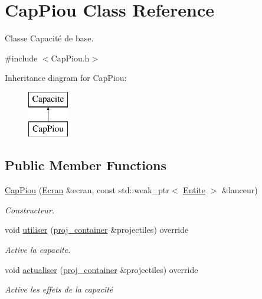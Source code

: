 \hypertarget{class_cap_piou}{}\section{Cap\+Piou Class Reference}
\label{class_cap_piou}


Classe Capacité de base.  




{\ttfamily \#include $<$Cap\+Piou.\+h$>$}

Inheritance diagram for Cap\+Piou\+:\begin{figure}[H]
\begin{center}
\leavevmode
\includegraphics[height=2.000000cm]{class_cap_piou}
\end{center}
\end{figure}
\subsection*{Public Member Functions}
\begin{DoxyCompactItemize}
\item 
\mbox{\hyperlink{class_cap_piou_aa0c57fbd8faf4c26eec74e99f00d7af3}{Cap\+Piou}} (\mbox{\hyperlink{class_ecran}{Ecran}} \&ecran, const std\+::weak\+\_\+ptr$<$ \mbox{\hyperlink{class_entite}{Entite}} $>$ \&lanceur)
\begin{DoxyCompactList}\small\item\em Constructeur. \end{DoxyCompactList}\item 
void \mbox{\hyperlink{class_cap_piou_a8833dd4c07fac882bcbad2698fdcd8c4}{utiliser}} (\mbox{\hyperlink{def__type_8h_a87980cd8ee9533e561a73e8bbc728188}{proj\+\_\+container}} \&projectiles) override
\begin{DoxyCompactList}\small\item\em Active la capacite. \end{DoxyCompactList}\item 
void \mbox{\hyperlink{class_cap_piou_ae566dc069b127f27cdd770f72dbdcbe4}{actualiser}} (\mbox{\hyperlink{def__type_8h_a87980cd8ee9533e561a73e8bbc728188}{proj\+\_\+container}} \&projectiles) override
\begin{DoxyCompactList}\small\item\em Active les effets de la capacité \end{DoxyCompactList}\end{DoxyCompactItemize}
